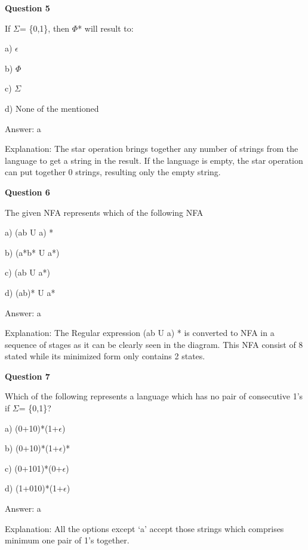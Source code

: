 \documentclass{article}
\begin{document}
\begin{mdframed}[linewidth=1pt, roundcorner=5pt, linecolor=gray!30, backgroundcolor=gray!5]
\textbf{Question 5} 

If $\Sigma$= \{0,1\}, then $\Phi$* will result to:

a) $\epsilon$

b) $\Phi$

c) $\Sigma$

d) None of the mentioned
\vspace{5pt} \par
\begin{tcolorbox}[colback=green!5, colframe=green!40!black, title=Solution]
Answer: a

Explanation: The star operation brings together any number of strings from the language to get a string in the result. If the language is empty, the star operation can put together 0 strings, resulting only the empty string.
\end{tcolorbox}
\end{mdframed}

\begin{mdframed}[linewidth=1pt, roundcorner=5pt, linecolor=gray!30, backgroundcolor=gray!5]
\textbf{Question 6} 

The given NFA represents which of the following NFA

a) (ab U a) *

b) (a*b* U a*)

c) (ab U a*)

d) (ab)* U a*
\vspace{5pt} \par
\begin{tcolorbox}[colback=green!5, colframe=green!40!black, title=Solution]
Answer: a

Explanation: The Regular expression (ab U a) * is converted to NFA in a sequence of stages as it can be clearly seen in the diagram. This NFA consist of 8 stated while its minimized form only contains 2 states.
\end{tcolorbox}
\end{mdframed}
\newpage

\begin{mdframed}[linewidth=1pt, roundcorner=5pt, linecolor=gray!30, backgroundcolor=gray!5]
\textbf{Question 7} 

Which of the following represents a language which has no pair of consecutive 1's if $\Sigma$= \{0,1\}?

a) (0+10)*(1+$\epsilon$)

b) (0+10)*(1+$\epsilon$)*

c) (0+101)*(0+$\epsilon$)

d) (1+010)*(1+$\epsilon$)
\vspace{5pt} \par
\begin{tcolorbox}[colback=green!5, colframe=green!40!black, title=Solution]
Answer: a

Explanation: All the options except ‘a' accept those strings which comprises minimum one pair of 1's together.
\end{tcolorbox}
\end{mdframed}
\end{document}
